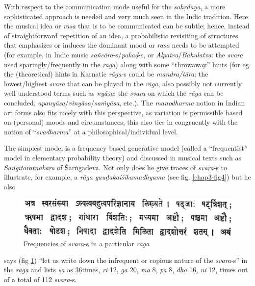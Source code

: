 With respect to the communication mode useful for the \textsl{sahṛdaya}, a more sophisticated approach is needed and very much seen in the Indic tradition. Here the musical idea or \textsl{rasa} that is to be communicated can be subtle; hence, instead of straightforward repetition of an idea, a probabilistic revisiting of structures that emphasizes or induces the dominant mood or \textsl{rasa} needs to be attempted (for example, in Indic music \textsl{sañcāra}-s/\textsl{pakaḍ}-s, or \textsl{Alpatva}/\textsl{Bahulatva}: the \textsl{svara} used sparingly/frequently in the \textsl{rāga}) along with some “throwaway” hints (for eg. the (theoretical) hints in Karnatic \textsl{rāga}-s could be \textsl{mandra/tāra}: the lowest/highest \textsl{svara} that can be played in the \textsl{rāga}, also possibly not currently well understood terms such as \textsl{nyāsa}: the \textsl{svara} on which the \textsl{rāga} can be concluded, \textsl{apanyāsa}/\textsl{vinyāsa}/\textsl{saṁyāsa}, etc.). The \textsl{manodharma} notion in Indian art forms also fits nicely with this perspective, as variation is permissible based on (personal) moods and circumstances; this also ties in congruently with the notion of “\textsl{svadharma}” at a philosophical/individual level.

The simplest model is a frequency based generative model (called a “frequentist” model in elementary probability theory) and discussed in musical texts such as \textsl{Saṅgītaratnākara} of Śārṅgadeva. Not only does he give traces of \textsl{svara}-s to illustrate, for example, a \textsl{rāga gauḍakaiśikamadhyama} (see fig. \ref{chap3-fig4}) but he also 
\begin{figure}[H]
\centering
\includegraphics[scale=.35]{figures/5.eps}
\caption{Frequencies of \textsl{svara}-s in a particular \textsl{rāga}}\label{chap3-fig3}
\end{figure}
says (fig \ref{chap3-fig3}) “let us write down the infrequent or copious nature of the \textsl{svara}-s” in the \textsl{rāga} and lists \textsl{sa} as 36times, \textsl{ri} 12, \textsl{ga} 20, \textsl{ma} 8, \textsl{pa} 8, \textsl{dha} 16, \textsl{ni} 12, times out of a total of 112 \textsl{svara}-s. 

